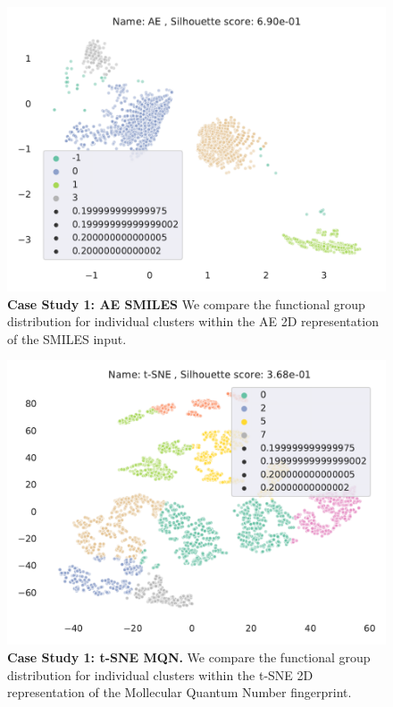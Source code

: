 \begin{figure}[H]
    \centering
    \includegraphics[height=\textwidth]{outputs/AE/smiles_all.pdf}
    \caption{\textbf{Case Study 1: AE SMILES} We compare the functional group distribution for individual clusters within the AE 2D representation of the SMILES input.}
    \label{fig:aesmilescase}
\end{figure}



\begin{figure}[H]
    \centering
    \includegraphics[width=\textwidth]{outputs/t-SNE/mqn_all.pdf}
    \caption{\textbf{Case Study 1: t-SNE MQN.} We compare the functional group distribution for individual clusters within the t-SNE 2D representation of the Mollecular Quantum Number fingerprint.}
    \label{fig:tsnemqncase}
\end{figure}









